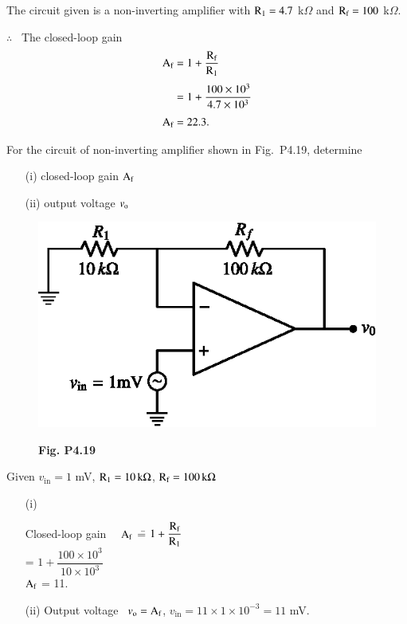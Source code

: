 \begin{solution}
The circuit given is a non-inverting amplifier with $\textrm{R}_{1}=4.7$ k$\Omega$ and $\textrm{R}_{\textrm{f}}=100$ k$\Omega$.

$\therefore$~ The closed-loop gain
\begin{align*}
\textrm{A}_{\textrm{f}} &= 1+\frac{\textrm{R}_{\textrm{f}}}{\textrm{R}_{1}}\\[3pt]
          &= 1+\frac{100\times 10^{3}}{4.7\times 10^{3}}\\[3pt]
\textrm{A}_{\textrm{f}} &= 22.3.
\end{align*}
\end{solution}

\begin{problem}\label{prob4.19}
For the circuit of non-inverting amplifier shown in Fig.~P4.19, determine
\begin{itemize}
\item[(i)] closed-loop gain $\textrm{A}_{\textrm{f}}$

\item[(ii)] output voltage $v_{\textrm{o}}$
\end{itemize}
\begin{figure}[H]
\centering
\includegraphics{chap4/figP4.19.eps}

\smallskip
{\bf Fig. P4.19}
\end{figure}
\end{problem}

\begin{solution}
Given $v_{\text{in}}=1$ mV, $\textrm{R}_{1}=10\,\textrm{k} \Omega$, $\textrm{R}_{\textrm{f}}=100\,\textrm{k}\Omega$
\begin{itemize}
\item[(i)] 
\begin{tabbing}
Closed-loop gain~~ $\textrm{A}_{\textrm{f}}$ \== $1+\dfrac{\textrm{R}_{\textrm{f}}}{\textrm{R}_{1}}$\\[4pt]
                                \>= $1+\dfrac{100\times 10^{3}}{10\times 10^{3}}$\\[4pt]
\phantom{aaaaaaaaaaqqqqqq,}$\textrm{A}_{\textrm{f}}$ \>= 11.
\end{tabbing}

\item[(ii)] Output voltage~ $v_{\textrm{o}}=\textrm{A}_{\textrm{f}}$, $v_{\text{in}}=11\times 1\times 10^{-3}=11$ mV.
\end{itemize}
\end{solution}

